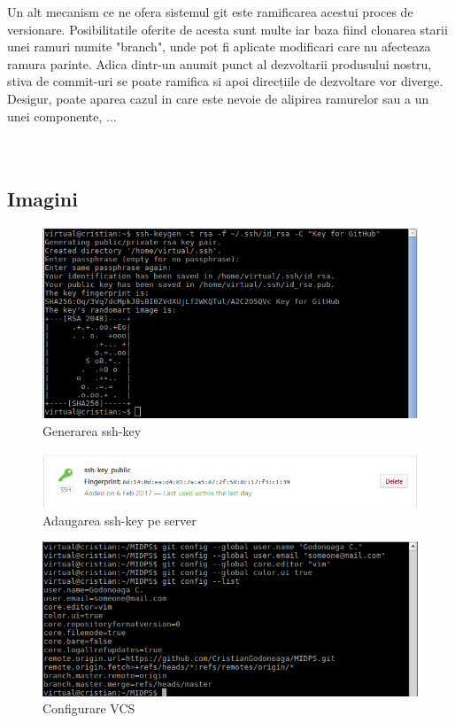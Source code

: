 Un alt mecanism ce ne ofera sistemul git este ramificarea acestui proces de versionare. Posibilitatile oferite de acesta sunt multe iar baza fiind clonarea starii unei ramuri numite "branch", unde pot fi aplicate modificari care nu afecteaza ramura parinte. Adica dintr-un anumit punct al dezvoltarii produsului nostru, stiva de commit-uri se poate ramifica si apoi direcțiile de dezvoltare vor diverge. Desigur, poate aparea cazul in care este nevoie de alipirea ramurelor sau a un unei componente, ...
\\
\\
\\



\subsection{Imagini}

\begin{figure}[htb]
	\begin{center}
		\centering
		\includegraphics[scale = 0.9]{img/ssh_key.png}
		\caption{Generarea ssh-key}%
		\label{fig:generarea_ssh_key}
	\end{center}
\end{figure}

\begin{figure}[htb]
	\begin{center}
		\centering
		\includegraphics[scale = 0.8]{img/add_key_onserver.png}
		\caption{Adaugarea ssh-key pe server}%
		\label{fig:add_key_onserver}
	\end{center}
\end{figure}

\begin{figure}[htb]
	\begin{center}
		\centering
		\includegraphics[scale = 0.9]{img/git_config.png}
		\caption{Configurare VCS}%
		\label{fig:git_config}
	\end{center}
\end{figure}
\clearpage